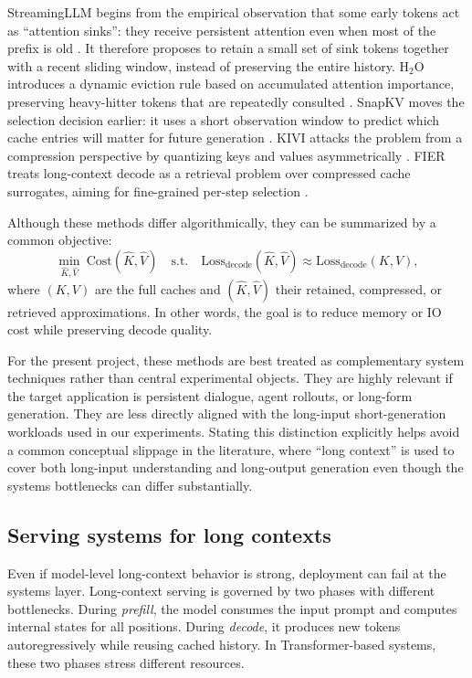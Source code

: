 \documentclass[11pt]{article}
\begin{document}
StreamingLLM begins from the empirical observation that some early tokens act as ``attention sinks'': they receive persistent attention even when most of the prefix is old \citep{xiao2023streamingllm}. It therefore proposes to retain a small set of sink tokens together with a recent sliding window, instead of preserving the entire history. H$_2$O introduces a dynamic eviction rule based on accumulated attention importance, preserving heavy-hitter tokens that are repeatedly consulted \citep{zhang2023h2o}. SnapKV moves the selection decision earlier: it uses a short observation window to predict which cache entries will matter for future generation \citep{li2024snapkv}. KIVI attacks the problem from a compression perspective by quantizing keys and values asymmetrically \citep{liu2024kivi}. FIER treats long-context decode as a retrieval problem over compressed cache surrogates, aiming for fine-grained per-step selection \citep{wang2025fier}.

Although these methods differ algorithmically, they can be summarized by a common objective:
\begin{equation}
\min_{\hat{K},\hat{V}} \ \mathrm{Cost}(\hat{K},\hat{V})
\quad \text{s.t.} \quad
\mathrm{Loss}_{\mathrm{decode}}(\hat{K},\hat{V}) \approx \mathrm{Loss}_{\mathrm{decode}}(K,V),
\end{equation}
where $(K,V)$ are the full caches and $(\hat{K},\hat{V})$ their retained, compressed, or retrieved approximations. In other words, the goal is to reduce memory or IO cost while preserving decode quality.

For the present project, these methods are best treated as complementary system techniques rather than central experimental objects. They are highly relevant if the target application is persistent dialogue, agent rollouts, or long-form generation. They are less directly aligned with the long-input short-generation workloads used in our experiments. Stating this distinction explicitly helps avoid a common conceptual slippage in the literature, where ``long context'' is used to cover both long-input understanding and long-output generation even though the systems bottlenecks can differ substantially.


\subsection{Serving systems for long contexts}
Even if model-level long-context behavior is strong, deployment can fail at the systems layer. Long-context serving is governed by two phases with different bottlenecks. During \emph{prefill}, the model consumes the input prompt and computes internal states for all positions. During \emph{decode}, it produces new tokens autoregressively while reusing cached history. In Transformer-based systems, these two phases stress different resources.
\end{document}
